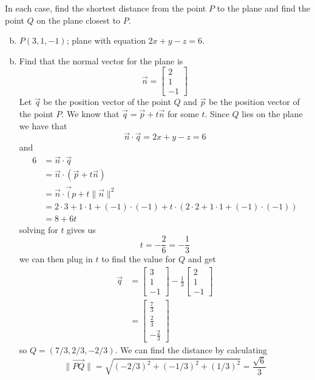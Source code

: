 \documentclass[../main.tex]{subfiles}
\begin{document}
In each case, find the shortest distance from the point $P$ to the plane and find the point $Q$ on the plane closest to $P$.
\begin{enumerate}[a)]
	\setcounter{enumi}{1}
	\item $P(3, 1, -1)$; plane with equation $2x + y - z = 6$.
\end{enumerate}

\solution
\begin{enumerate}[a)]
	\setcounter{enumi}{1}
	\item Find that the normal vector for the plane is 
        \[ \vec{n} = \begin{bmatrix}2\\1\\-1\end{bmatrix} \]
          Let $\vec{q}$ be the position vector of the point $Q$ and $\vec{p}$ be
          the position vector of the point $P$. We know that $\vec{q} = \vec{p}+t\vec{n}$ for some $t$.
          Since $Q$ lies on the plane we have that 
          \[ \vec{n} \cdot \vec{q} = 2x + y - z = 6 \]
          and
          \begin{align*} 
                6   &= \vec{n} \cdot \vec{q}\\ 
                    &= \vec{n} \cdot (\vec{p} + t\vec{n})\\
                    &= \vec{n} \cdot \vec({p} + t\| \vec{n} \|^2\\
                    &= 2 \cdot 3 + 1 \cdot 1 + (-1) \cdot (-1) + t \cdot (2 \cdot 2+1 \cdot 1+(-1) \cdot (-1))\\
                    &= 8+6t
          \end{align*}
          solving for $t$ gives us
          \[ t = -\frac{2}{6} = -\frac{1}{3} \]
          we can then plug in $t$ to find the value for $Q$ and get
          \begin{align*}
            \vec{q} &= \begin{bmatrix}3\\1\\-1\end{bmatrix}-\frac{1}{3}\begin{bmatrix}2\\1\\-1\end{bmatrix}\\
                    &= \begin{bmatrix}\frac{7}{3}\\\frac{2}{3}\\-\frac{2}{3}\end{bmatrix}
          \end{align*}
          so $Q = (7/3, 2/3, -2/3)$. We can find the distance by calculating
          \[ \|\vec{PQ}\| = \sqrt{(-2/3)^2 + (-1/3)^2 + (1/3)^2} = \frac{\sqrt{6}}{3} \]
\end{enumerate}
\end{document}
